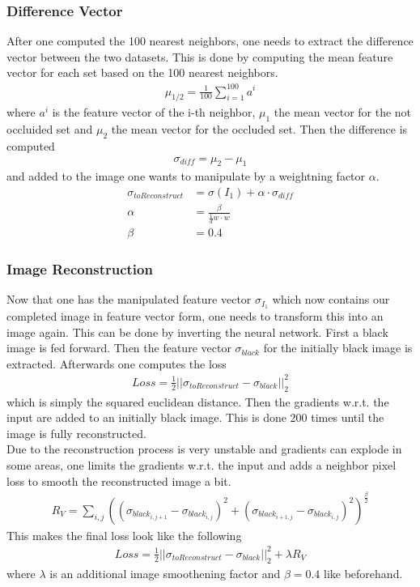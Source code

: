 \documentclass[
     11pt,         %
     a4paper,      %
     oneside,
     ]{article}
\begin{document}
\subsubsection{Difference Vector}
After one computed the 100 nearest neighbors, one needs to extract the difference vector between the two datasets.
This is done by computing the mean feature vector for each set based on the 100 nearest neighbors.
\begin{align*}
  \mu_{1/2} = \frac{1}{100} \sum^{100}_{i=1} a^i
\end{align*}
where $a^i$ is the feature vector of the i-th neighbor, $\mu_1$ the mean vector for the not occluided set and $\mu_2$ the mean vector for the occluded set.
Then the difference is computed
\begin{align*}
  \sigma_{diff} = \mu_2 - \mu_1
\end{align*}
and added to the image one wants to manipulate by a weightning factor $\alpha$.
\begin{align*}
  \sigma_{toReconstruct} &= \sigma (I_1) + \alpha \cdot \sigma_{diff}\\
  \alpha &= \frac{\beta}{\frac{1}{d} w \cdot w}\\
  \beta &= 0.4
\end{align*}
\subsubsection{Image Reconstruction}
Now that one has the manipulated feature vector $\sigma_{I_1}$ which now contains our completed image in feature vector form, one needs to transform this into an image again. This can be done by inverting the neural network. First a black image is fed forward. Then the feature vector $\sigma_{black}$ for the initially black image is extracted. Afterwards one computes the loss
\begin{align*}
  Loss = \frac{1}{2} ||\sigma_{toReconstruct} - \sigma_{black}||_2^2
\end{align*}
which is simply the squared euclidean distance.
Then the gradients w.r.t. the input are added to an initially black image. This is done 200 times until the image is fully reconstructed. \\
Due to the reconstruction process is very unstable and gradients can explode in some areas, one limits the gradients w.r.t. the input and adds a neighbor pixel loss to smooth the reconstructed image a bit.
\begin{align*}
  R_V = \sum_{i,j} ((\sigma_{black_{i,j+1}} - \sigma_{black_{i,j}})^2 + (\sigma_{black_{i+1,j}} - \sigma_{black_{i,j}})^2)^{\frac{\beta}{2}}
\end{align*}
This makes the final loss look like the following
\begin{align*}
  Loss = \frac{1}{2} ||\sigma_{toReconstruct} - \sigma_{black}||_2^2 + \lambda R_V
\end{align*}
where $\lambda$ is an additional image smoothening factor and $\beta = 0.4$ like beforehand.
\end{document}
